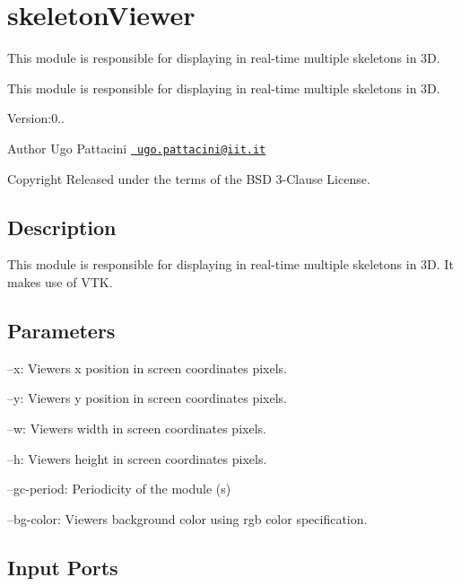 \section{skeleton\+Viewer}
\label{group__skeletonViewer}


This module is responsible for displaying in real-\/time multiple skeletons in 3D.  


This module is responsible for displaying in real-\/time multiple skeletons in 3D. 

Version\+:0.. \begin{DoxyAuthor}{Author}
Ugo Pattacini \href{mailto:ugo.pattacini@iit.it}{\texttt{ ugo.\+pattacini@iit.\+it}} ~\newline
 
\end{DoxyAuthor}
\begin{DoxyCopyright}{Copyright}
Released under the terms of the B\+SD 3-\/Clause License. 
\end{DoxyCopyright}
\hypertarget{group__skeletonViewer_intro_sec}{}\subsection{Description}\label{group__skeletonViewer_intro_sec}
This module is responsible for displaying in real-\/time multiple skeletons in 3D. It makes use of V\+TK.\hypertarget{group__skeletonViewer_parameters_sec}{}\subsection{Parameters}\label{group__skeletonViewer_parameters_sec}

\begin{DoxyItemize}
\item --x\+: Viewer\textquotesingle{}s x position in screen coordinates pixels.
\item --y\+: Viewer\textquotesingle{}s y position in screen coordinates pixels.
\item --w\+: Viewer\textquotesingle{}s width in screen coordinates pixels.
\item --h\+: Viewer\textquotesingle{}s height in screen coordinates pixels.
\item --gc-\/period\+: Periodicity of the module (s)
\item --bg-\/color\+: Viewer\textquotesingle{}s background color using rgb color specification. 
\end{DoxyItemize}\hypertarget{group__skeletonViewer_inputports_sec}{}\subsection{Input Ports}\label{group__skeletonViewer_inputports_sec}

